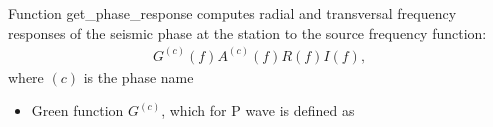\documentclass[letterpaper,10pt,english]{sphinxmanual}
\begin{document}
\begin{fulllineitems}
\label{\detokenize{api_support:amw.mw.parameters.get_phase_response}}
\pysigstartsignatures
{}
\pysigstopsignatures
\sphinxAtStartPar
Function get\_phase\_response computes radial and transversal frequency responses of the seismic phase
at the station to the source frequency function:
\begin{equation*}
\begin{split}G^{\left(c\right)}\left(f\right)A^{\left(c\right)}\left(f\right)R\left(f\right)I\left(f\right),\end{split}
\end{equation*}
\sphinxAtStartPar
where \(\left(c\right)\) is the phase name
\begin{description}
\begin{itemize}
\item {} 
\sphinxAtStartPar
Green function \(G^{\left(c\right)}\), which for P wave is defined as

\end{itemize}


\end{description}
\end{fulllineitems}
\end{document}
